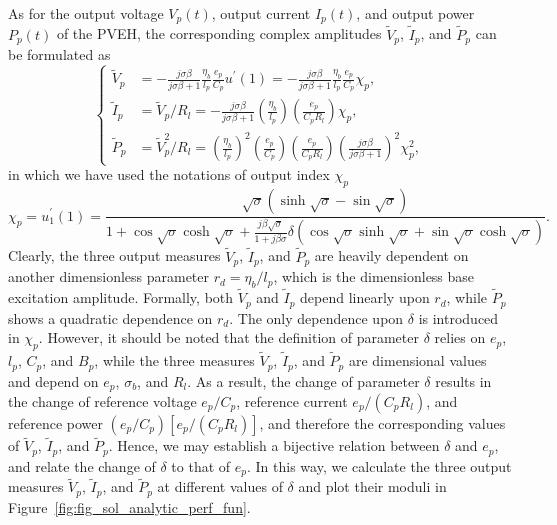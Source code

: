 \documentclass{svjour3}                     %
\begin{document}
As for the output voltage $V_p(t)$, output current $I_p(t)$, and output power $P_p(t)$ of the PVEH, the corresponding complex amplitudes $\tilde{V}_p$, $\tilde{I}_p$, and $\tilde{P}_p$ can be formulated as
\begin{equation}
    \left\{\begin{aligned}
        \tilde{V}_p &= -\frac{j \sigma \beta}{j \sigma \beta + 1} \frac{\eta_b}{l_p} \frac{e_p}{C_p} u^\prime(1) = -\frac{j \sigma \beta}{j \sigma \beta + 1} \frac{\eta_b}{l_p} \frac{e_p}{C_p} \chi_p, \\
        \tilde{I}_p &=  \tilde{V}_p / R_l = - \frac{ j \sigma \beta } {j \sigma \beta + 1} \left( \frac{\eta_b}{l_p} \right) \left( \frac{e_p}{C_p R_l} \right) \chi_p , \\
        \tilde{P}_p &=  \tilde{V}_p^2 / R_l = \left(\frac{\eta_b}{l_p}\right)^2 \left(\frac{e_p}{C_p}\right) \left( \frac{e_p}{C_p R_l} \right) \left( \frac{ j \sigma \beta}{ j \sigma \beta + 1 } \right)^2 \chi_p^2,
    \end{aligned}\right.
    \label{eq:eq_peh_perfs_compact_form}
\end{equation}
in which we have used the notations of output index $\chi_p$ 
\begin{equation}
    \chi_p = u_1^\prime(1) = \frac{ \sqrt{\sigma} \left( \sinh\sqrt{\sigma} - \sin\sqrt{\sigma} \right) }{ 1 + \cos\sqrt{\sigma } \cosh\sqrt{\sigma } + \frac{j \beta \sqrt{\sigma}}{ 1+ j \beta \sigma } \delta \left( \cos\sqrt{\sigma } \sinh\sqrt{\sigma } + \sin\sqrt{\sigma } \cosh\sqrt{\sigma } \right) }.
    \label{eq:eq_peh_perfs_compact_form_end_ders}
\end{equation}
Clearly, the three output measures $\tilde{V}_p$, $\tilde{I}_p$, and $\tilde{P}_p$ are heavily dependent on another dimensionless parameter $r_d = \eta_b/l_p$, which is the dimensionless base excitation amplitude. Formally, both $\tilde{V}_p$ and $\tilde{I}_p$ depend linearly upon $r_d$, while $\tilde{P}_p$ shows a quadratic dependence on $r_d$. The only dependence upon $\delta$ is introduced in $\chi_p$. However, it should be noted that the definition of parameter $\delta$ relies on $e_p$, $l_p$, $C_p$, and $B_p$, while the three measures $\tilde{V}_p$, $\tilde{I}_p$, and $\tilde{P}_p$ are dimensional values and depend on $e_p$, $\sigma_b$, and $R_l$. As a result, the change of parameter $\delta$ results in the change of reference voltage $e_p / C_p$, reference current $e_p / (C_p R_l)$, and reference power $(e_p / C_p)[e_p / (C_p R_l)]$, and therefore the corresponding values of $\tilde{V}_p$, $\tilde{I}_p$, and $\tilde{P}_p$. Hence, we may establish a bijective relation between $\delta$ and $e_p$, and relate the change of $\delta$ to that of $e_p$. In this way, we calculate the three output measures $\tilde{V}_p$, $\tilde{I}_p$, and $\tilde{P}_p$ at different values of $\delta$ and plot their moduli in Figure~\ref{fig:fig_sol_analytic_perf_fun}.
\end{document}
